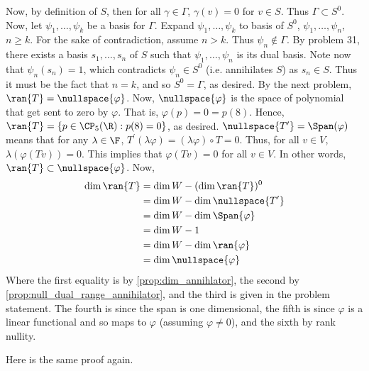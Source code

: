 \documentclass{book}
\begin{document}
\begin{enumerate}[label=\arabic*)]
      Now, by definition of $S$, then for all $\gamma \in \Gamma$, $\gamma(v) = 0$ for $v \in S$. Thus $\Gamma \subset S^0$. Now, let $\psi_1, \dots, \psi_k$ be a basis for $\Gamma$. Expand
      $\psi_1, \dots, \psi_k$ to basis of $S^0$, $\psi_1, \dots, \psi_n$, $n \geq k$. For the sake of contradiction, assume $n > k$. Thus $\psi_n \not\in \Gamma$. By problem 31, there exists
      a basis $s_1, \dots, s_n$ of $S$ such that $\psi_1, \dots, \psi_n$ is its dual basis. Note now that $\psi_n(s_n) = 1$, which contradicts $\psi_n \in S^0$ (i.e. annihilates $S$) as $s_n
      \in S$. Thus it must be the fact that $n = k$, and so $S^0 = \Gamma$, as desired.
    \ii
      By the next problem, $\ran{T} = \nullspace{\varphi}$. Now, $\nullspace{\varphi}$ is the space of polynomial that get sent to zero by $\varphi$. That is, $\varphi(p) = 0 = p(8)$. Hence,
      $\ran{T} = \{p \in \CP_5(\R): p(8) = 0\}$, as desired.
    \ii
      $\nullspace{T^{\prime}} = \Span(\varphi)$ means that for any $\lambda \in \F$, $T^{\prime}(\lambda\varphi) = (\lambda\varphi)\circ T = 0$. Thus, for all $v \in V$,
      $\lambda(\varphi(Tv)) = 0$. This implies that $\varphi(Tv) = 0$ for all $v \in V$. In other words, $\ran{T} \subset \nullspace{\varphi}$. Now,
      \begin{align*}
        \dim{\ran{T}} & = \dim{W} - (\dim{\ran{T}})^0 \\
        & = \dim{W} - \dim{\nullspace{T^{\prime}}} \\
        & = \dim{W} - \dim{\Span{\varphi}} \\
        & = \dim{W} - 1 \\
        & = \dim{W} - \dim{\ran{\varphi}} \\
        & = \dim{\nullspace{\varphi}}
      \end{align*}
      Where the first equality is by \eqref{prop:dim_annihlator}, the second by \eqref{prop:null_dual_range_annihilator}, and the third is given in the problem statement. The fourth is since
      the span is one dimensional, the fifth is since $\varphi$ is a linear functional and so maps to $\varphi$ (assuming $\varphi \neq 0$), and the sixth by rank nullity.
      
      Here is the same proof again.


\end{enumerate}
\end{document}
